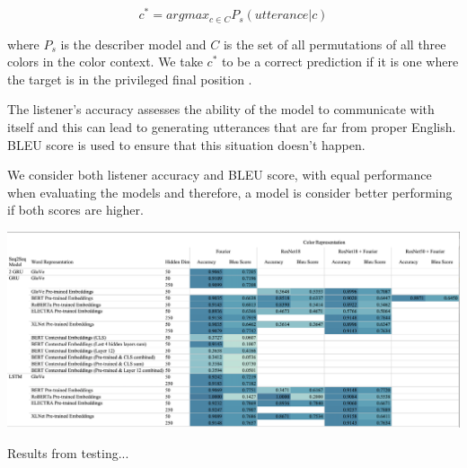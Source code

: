 \[c^{*} = argmax_{c \in C} P_{s} (utterance | c)\]

\par
where \(P_{s}\) is the describer model and \(C\) is the set of all permutations of all three colors in the color context. We take \(c^{*}\) to be a correct prediction if it is one where the target is in the privileged final position \citep{potts-2020-colors}.

\par
The listener's accuracy assesses the ability of the model to communicate with itself and this can lead to generating utterances that are far from proper English. BLEU score is used to ensure that this situation doesn’t happen.

\par
We consider both listener accuracy and BLEU score, with equal performance when evaluating the models and therefore, a model is consider better performing if both scores are higher.

\begin{table}[ht]
\centering
\includegraphics[width=\textwidth]{assets/heatmap.png}
\caption[Heatmap]{Results from testing...}
\label{table:heatmap}
\end{table}


